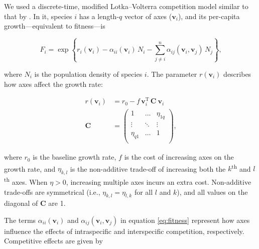 We used a discrete-time, modified Lotka--Volterra competition model similar to
that by \citet{Northfield2013a}.
In it, species $i$ has a length-$q$ vector of axes ($\mathbf{v}_i$), and
its per-capita growth---equivalent to fitness---is

\begin{equation} \label{eq:fitness}
    F_{i} = \exp \left\{ r_i(\mathbf{v}_i) - 
        \alpha_{ii}(\mathbf{v}_i) \, N_i - \sum_{j \ne i}^{n}{
            \alpha_{ij}(\mathbf{v}_i, \mathbf{v}_j) \, N_j}  
    \right\}\textrm{,}
\end{equation}

\noindent where $N_i$ is the population density of species $i$.
The parameter $r(\mathbf{v}_i)$ describes how axes affect
the growth rate:

\begin{equation} \label{eq:growth-rate}
\begin{split}
    r(\mathbf{v}_i) &= r_0 - f \, \mathbf{v}_i^{\textrm{T}} \, \mathbf{C} ~ \mathbf{v}_{i} \\
    \mathbf{C} &= \begin{pmatrix}
        1         & \ldots & \eta_{1q} \\
        \vdots    & \ddots & \vdots \\
        \eta_{q1} & \ldots & 1      \\
        \end{pmatrix}
    \textrm{,}
\end{split}
\end{equation}

\noindent where $r_0$ is the baseline growth rate,
$f$ is the cost of increasing axes on the growth rate, and
$\eta_{k,l}$ is the non-additive trade-off of increasing both the
$k$\textsuperscript{th} and $l$\textsuperscript{th} axes.
When $\eta > 0$, increasing multiple axes incurs an extra cost.
Non-additive trade-offs are symmetrical (i.e., $\eta_{k,l} = \eta_{l,k}$ for all
$l$ and $k$), and all values on the diagonal of $\mathbf{C}$ are 1.


The terms $\alpha_{ii}(\mathbf{v}_i)$ and
$\alpha_{ij}(\mathbf{v}_i, \mathbf{v}_j)$
in equation \ref{eq:fitness} represent how axes influence the effects
of intraspecific and interspecific competition, respectively.
Competitive effects are given by

